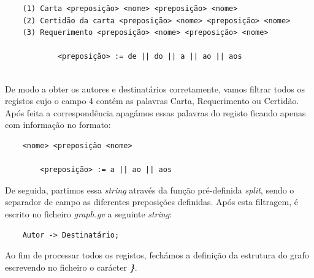 \documentclass[11pt,a4paper]{report}
\begin{document}
\begin{verbatim}
    (1) Carta <preposição> <nome> <preposição> <nome>
    (2) Certidão da carta <preposição> <nome> <preposição> <nome>
    (3) Requerimento <preposição> <nome> <preposição> <nome>
    
            <preposição> := de || do || a || ao || aos 
    
\end{verbatim}

\quad De modo a obter os autores e destinatários corretamente, vamos filtrar todos os registos cujo o campo 4 contém as palavras Carta, Requerimento ou Certidão. Após feita a correspondência apagámos essas palavras do registo ficando apenas com informação no formato: 

\begin{verbatim}
    <nome> <preposição <nome>
    
        <preposição> := a || ao || aos
\end{verbatim}

\quad De seguida, partimos essa \textit{string} através da função pré-definida \textit{split}, sendo o separador de campo as diferentes preposições definidas. Após esta filtragem, é escrito no ficheiro \textit{graph.gv} a seguinte \textit{string}:

\begin{verbatim}
    Autor -> Destinatário;
\end{verbatim}

\quad Ao fim de processar todos os registos, fechámos a definição da estrutura do grafo escrevendo no ficheiro o carácter \textbf{\textit{\}}}.
\end{document}
